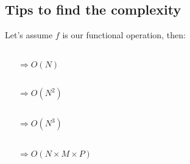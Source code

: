 \documentclass{beamer}[10pt, usepdftitle=false, handout]
\begin{document}
	\subsection{Tips to find the complexity}	
	
	\begin{frame}
	
	Let's assume $f$  is our functional operation, then:
	
	\begin{columns}[c]
	\begin{center}  
    \scalebox{0.55} {
    \begin{algorithm}[H]
	\end{algorithm}	
	}
	\end{center} 
	$\Longrightarrow O(N)$
	\end{columns}	
	
	\begin{columns}[c]
	\begin{center}    
    \scalebox{0.55} {
    \begin{algorithm}[H]
	\end{algorithm}	
	}
	\end{center} 
	$\Longrightarrow O(N^2)$
	\end{columns}	
	
	\begin{columns}[c]
	\begin{center}    
    \scalebox{0.55} {
    \begin{algorithm}[H]
	\end{algorithm}	
	}
	\end{center}
	$\Longrightarrow O(N^3)$
	\end{columns}
		
	\begin{columns}[c]
	\begin{center}    
    \scalebox{0.55} {
    \begin{algorithm}[H]
	\end{algorithm}	
	}
	\end{center}
	$\Longrightarrow O(N\times M\times P)$	
	\end{columns}
		
	\end{frame}		
	
\end{document}
